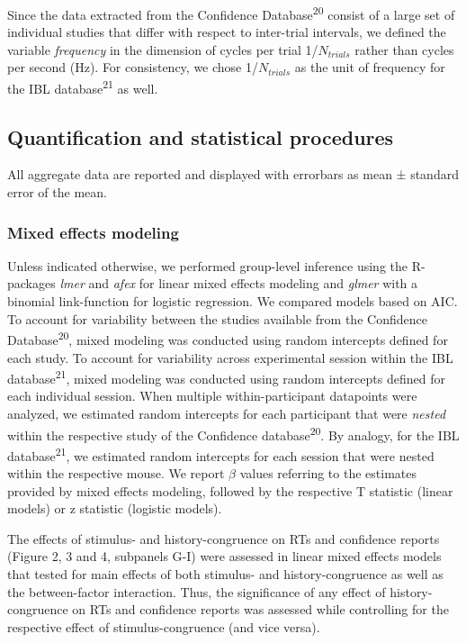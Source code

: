 \documentclass[
]{article}
\begin{document}
Since the data extracted from the Confidence
Database\textsuperscript{20} consist of a large set of individual
studies that differ with respect to inter-trial intervals, we defined
the variable \emph{frequency} in the dimension of cycles per trial
1/\(N_{trials}\) rather than cycles per second (Hz). For consistency, we
chose 1/\(N_{trials}\) as the unit of frequency for the IBL
database\textsuperscript{21} as well.

\hypertarget{quantification-and-statistical-procedures}{%
\subsection{Quantification and statistical
procedures}\label{quantification-and-statistical-procedures}}

All aggregate data are reported and displayed with errorbars as mean ±
standard error of the mean.

\hypertarget{mixed-effects-modeling}{%
\subsubsection{Mixed effects modeling}\label{mixed-effects-modeling}}

Unless indicated otherwise, we performed group-level inference using the
R-packages \emph{lmer} and \emph{afex} for linear mixed effects modeling
and \emph{glmer} with a binomial link-function for logistic regression.
We compared models based on AIC. To account for variability between the
studies available from the Confidence Database\textsuperscript{20},
mixed modeling was conducted using random intercepts defined for each
study. To account for variability across experimental session within the
IBL database\textsuperscript{21}, mixed modeling was conducted using
random intercepts defined for each individual session. When multiple
within-participant datapoints were analyzed, we estimated random
intercepts for each participant that were \emph{nested} within the
respective study of the Confidence database\textsuperscript{20}. By
analogy, for the IBL database\textsuperscript{21}, we estimated random
intercepts for each session that were nested within the respective
mouse. We report \(\beta\) values referring to the estimates provided by
mixed effects modeling, followed by the respective T statistic (linear
models) or z statistic (logistic models).

The effects of stimulus- and history-congruence on RTs and confidence
reports (Figure 2, 3 and 4, subpanels G-I) were assessed in linear mixed
effects models that tested for main effects of both stimulus- and
history-congruence as well as the between-factor interaction. Thus, the
significance of any effect of history-congruence on RTs and confidence
reports was assessed while controlling for the respective effect of
stimulus-congruence (and vice versa).
\end{document}
